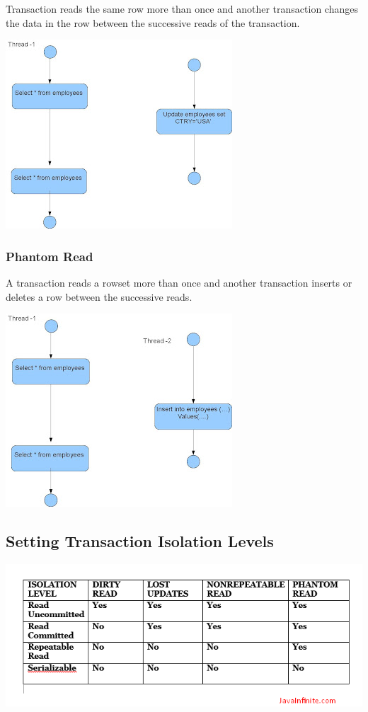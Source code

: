 Transaction reads the same row more than once and another transaction changes the data in the row between the successive reads of the transaction.

\includegraphics{./images/chapter-tx/NonRepeatable.JPG}

\subsubsection{Phantom Read}

A transaction reads a rowset more than once and another transaction inserts or deletes a row between the successive reads.

\includegraphics{./images/chapter-tx/PhantomRead.JPG}

\subsection{Setting Transaction Isolation Levels}

\includegraphics{./images/chapter-tx/isolation_level.png}

